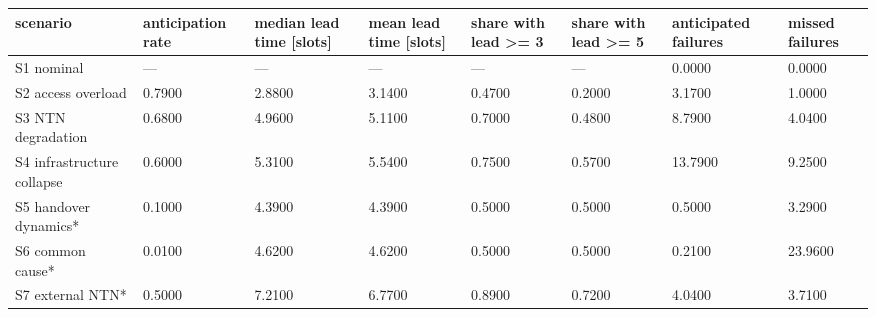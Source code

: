 \begin{tabular}{llllllll}
\toprule
scenario & anticipation rate & median lead time [slots] & mean lead time [slots] & share with lead >= 3 & share with lead >= 5 & anticipated failures & missed failures \\
\midrule
S1 nominal & — & — & — & — & — & 0.0000 & 0.0000 \\
S2 access overload & 0.7900 & 2.8800 & 3.1400 & 0.4700 & 0.2000 & 3.1700 & 1.0000 \\
S3 NTN degradation & 0.6800 & 4.9600 & 5.1100 & 0.7000 & 0.4800 & 8.7900 & 4.0400 \\
S4 infrastructure collapse & 0.6000 & 5.3100 & 5.5400 & 0.7500 & 0.5700 & 13.7900 & 9.2500 \\
S5 handover dynamics* & 0.1000 & 4.3900 & 4.3900 & 0.5000 & 0.5000 & 0.5000 & 3.2900 \\
S6 common cause* & 0.0100 & 4.6200 & 4.6200 & 0.5000 & 0.5000 & 0.2100 & 23.9600 \\
S7 external NTN* & 0.5000 & 7.2100 & 6.7700 & 0.8900 & 0.7200 & 4.0400 & 3.7100 \\
\bottomrule
\end{tabular}
